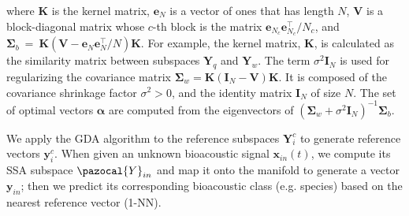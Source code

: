 \noindent where $\mathbf{K}$ is the kernel matrix, $\mathbf{e}_{N}$ is a vector
of ones that has length $N$, $\mathbf{V}$ is a block-diagonal matrix
whose $c$-th block is the matrix $\mathbf{e}_{N_{c}}\mathbf{e}_{N_{c}}^{\top}/ N_{c}$, and $\mathbf{\Sigma}_{b}~=~\mathbf{K}(\mathbf{V} - \mathbf{e}_{N}\mathbf{e}_{N}^{\top}/N)\mathbf{K}$.
For example, the kernel matrix, $\mathbf{K}$, is calculated as the similarity matrix between subspaces $\mathbf{Y}_{q}$ and $\mathbf{Y}_{w}$.
The term $\sigma^{2} \mathbf{I}_{N}$ is used for regularizing the covariance matrix $\mathbf{\Sigma}_{w} = \mathbf{K}(\mathbf{I}_{N}  -\mathbf{V})\mathbf{K}$. It is composed of the covariance shrinkage factor $\sigma^{2} > 0$, and the identity matrix $\mathbf{I}_{N}$ of size $N$. The set of optimal vectors $\mathbf{\alpha}$ are computed from the eigenvectors of $(\mathbf{\Sigma}_{w}+\sigma^{2}\mathbf{I}_{N})^{-1}\mathbf{\Sigma}_{b}$.

We apply the GDA algorithm to the reference subspaces $\mathbf{Y}_{i}^{c}$ to generate reference vectors $\mathbf{y}_{i}^{c}$. When given an unknown bioacoustic signal $\mathbf{x}_{in}(t)$, we compute its SSA subspace $\pazocal{Y}_{in}$ and map it onto the manifold to generate a vector $\mathbf{y}_{in}$; then we predict its corresponding bioacoustic class (e.g. species)  based on the nearest reference vector (1-NN).






